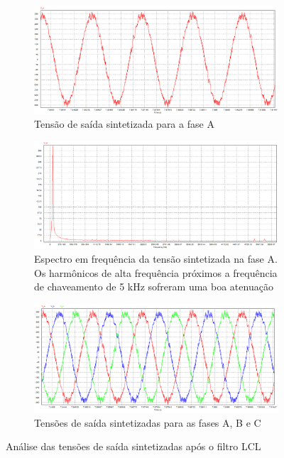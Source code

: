 \begin{figure}[!hbt]
	\centering
	\begin{subfigure}[b]{0.5\textwidth}
		\centering
		\includegraphics[width=\textwidth]{figuras/sim_figures/inversor_e_boost/tensao_va.PNG}
		\caption{Tensão de saída sintetizada para a fase A}
   \end{subfigure}

   \begin{subfigure}[b]{0.5\textwidth}
		\centering
		\includegraphics[width=\textwidth]{figuras/sim_figures/inversor_e_boost/tensao_va_espectro.PNG}
		\caption{Espectro em frequência da tensão sintetizada na fase A. Os harmônicos de alta frequência próximos a frequência de chaveamento de 5 kHz sofreram uma boa atenuação}
   \end{subfigure}

	\begin{subfigure}[b]{0.5\textwidth}
		\centering
		\includegraphics[width=\textwidth]{figuras/sim_figures/inversor_e_boost/tensao_va_vb_vc.PNG}
		\caption{Tensões de saída sintetizadas para as fases A, B e C}
	\end{subfigure}
    \caption{Análise das tensões de saída sintetizadas após o filtro LCL}
    \label{fig:sim-tensao-saida-inversor}
\end{figure}

